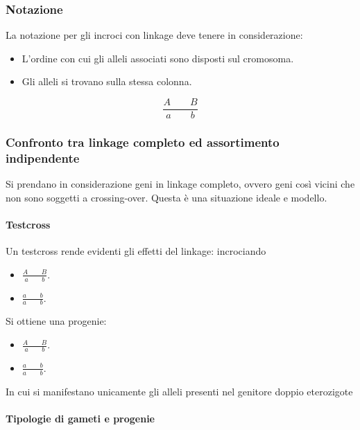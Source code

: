 		\subsubsection{Notazione}
		La notazione per gli incroci con linkage deve tenere in considerazione:
		\begin{multicols}{2}
			\begin{itemize}
				\item L'ordine con cui gli alleli associati sono disposti sul cromosoma.
				\item Gli alleli si trovano sulla stessa colonna.
			\end{itemize}
		\end{multicols}
		\[\dfrac{A\quad\quad B}{a\quad\quad b}\]

		\subsubsection{Confronto tra linkage completo ed assortimento indipendente}
		Si prendano in considerazione geni in linkage completo, ovvero geni cos\`i vicini che non sono soggetti a crossing-over.
		Questa \`e una situazione ideale e modello.
		
			\paragraph{Testcross}
			Un testcross rende evidenti gli effetti del linkage: incrociando
			\begin{multicols}{2}
				\begin{itemize}
					\item $\frac{A\quad\quad B}{a\quad\quad b}$.
					\item $\frac{a\quad\quad b}{a\quad\quad b}$.
				\end{itemize}
			\end{multicols}
			Si ottiene una progenie:
			\begin{multicols}{2}
				\begin{itemize}
					\item $\frac{A\quad\quad B}{a\quad\quad b}$.
					\item $\frac{a\quad\quad b}{a\quad\quad b}$.
				\end{itemize}
			\end{multicols}
			In cui si manifestano unicamente gli alleli presenti nel genitore doppio eterozigote

			\paragraph{Tipologie di gameti e progenie}

